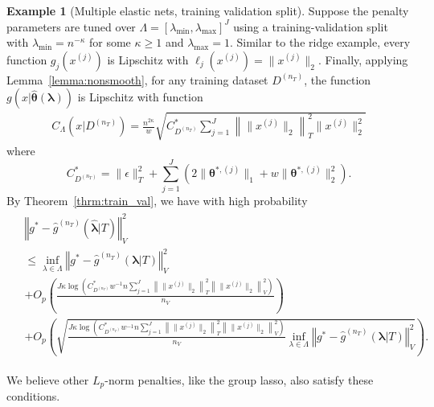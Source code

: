 \documentclass[12pt]{article} %
\theoremstyle{definition}
\newtheorem{example}{Example}
\begin{document}
\begin{example}[Multiple elastic nets, training validation split]
	Suppose the penalty parameters are tuned over $\Lambda = \left [ \lambda_{\min}, \lambda_{\max} \right ]^J$ using a training-validation split with $\lambda_{\min} = n^{-\kappa}$ for some $\kappa \ge 1$ and $\lambda_{\max} = 1$.
	Similar to the ridge example, every function $g_j(x^{(j)})$ is Lipschitz with $\ell_j(x^{(j)}) = \|x^{(j)}\|_2$.
	Finally, applying Lemma~\ref{lemma:nonsmooth}, for any training dataset $D^{(n_T)}$, the function $g(x | \hat{\boldsymbol{\theta}}(\boldsymbol{\lambda}))$ is Lipschitz with function
	\begin{align}
	C_\Lambda \left ( x | D^{(n_T)} \right ) =
	\frac{n^{2\kappa}}{w}
	\sqrt{
	C^*_{D^{(n_T)}}
	\sum_{j = 1}^J
	\left \|
	\|x^{(j)} \|_2
	\right \|_T^2
	\|x^{(j)}\|_2^2
	}
	\label{eq:elastic_lipschitz}
	\end{align}
	where $$
	C^*_{D^{(n_T)}} = 
	\|\epsilon\|_{T}^{2}
		+\sum_{j=1}^J
		\left (
		2 \|\boldsymbol{\theta}^{*,(j)}\|_1
		+ w\|\boldsymbol{\theta}^{*,(j)}\|_2^2
		\right )
	.$$
	By Theorem~\ref{thrm:train_val}, we have with high probability
	\begin{align}
	\begin{split}
	&\left\Vert g^* - \hat{g}^{(n_T)}( \hat{\boldsymbol{\lambda}} | T) \right\Vert _{V}^2\\
	&\le \inf_{\lambda \in \Lambda} \left\Vert g^* - \hat{g}^{(n_T)}( \boldsymbol{\lambda} | T) \right \Vert^2_{V}\\
	& + O_p\left (
	\frac{J \kappa
	\log \left (
	C^*_{D^{(n_T)}}
	w^{-1} n
	\sum_{j=1}^J
	\left \| \|x^{(j)}\|_2 \right \|_T^2 \left \| \|x^{(j)}\|_2 \right \|_V^2
	\right )}{n_{V}}
	\right ) \\
	& + O_p\left(
	\sqrt{
		\frac{J \kappa
		\log \left (
		C^*_{D^{(n_T)}}
		w^{-1} n
		\sum_{j=1}^J
		\left \| \|x^{(j)}\|_2 \right \|_T^2 \left \| \|x^{(j)}\|_2 \right \|_V^2
		\right )}{n_{V}}
		\inf_{\lambda \in \Lambda} \left\Vert g^* - \hat{g}^{(n_T)}( \boldsymbol{\lambda} | T) \right \Vert^2_{V}
	}
	\right ).
	\end{split}
	\end{align}
\end{example}

We believe other $L_p$-norm penalties, like the group lasso, also satisfy these conditions.
\end{document}
